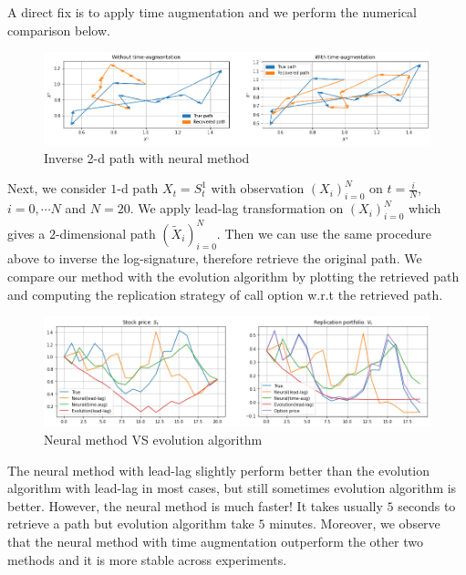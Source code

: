 \documentclass[12pt]{report}
\theoremstyle{definition}
\theoremstyle{remark}
\begin{document}
A direct fix is to apply time augmentation and we perform the numerical comparison below. 
\begin{figure}[H]
  \centering
  \includegraphics[width=\textwidth]{figs/inverse7.png}
  \caption{Inverse 2-d path with neural method}
\end{figure}
Next, we consider $1$-d path $X_{t} = S^{1}_{t}$ with observation $(X_{i})_{i=0}^{N}$ on $t = \frac{i}{N}$, $i = 0,\cdots N$ and $N = 20$. We apply lead-lag transformation on $(X_{i})_{i=0}^{N}$ which gives a $2$-dimensional path $(\tilde{X}_{i})_{i=0}^{N}$. Then we can use the same procedure above to inverse the log-signature, therefore retrieve the original path. We compare our method with the evolution algorithm by plotting the retrieved path and computing the replication strategy of call option w.r.t the retrieved path. 
\begin{figure}[H]
  \centering
  \includegraphics[width=\textwidth]{figs/inverse9.png}
  \caption{Neural method VS evolution algorithm}
\end{figure}
The neural method with lead-lag slightly perform better than the evolution algorithm with lead-lag in most cases, but still sometimes evolution algorithm is better. However, the neural method is much faster! It takes usually $5$ seconds to retrieve a path but evolution algorithm take $5$ minutes. Moreover, we observe that the neural method with time augmentation outperform the other two methods and it is more stable across experiments.   
\end{document}
